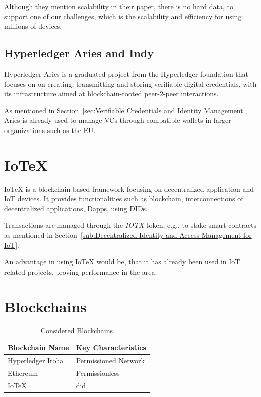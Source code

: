 Although they mention scalability in their paper, there is no hard data, to support one of our challenges, which is the
scalability and efficiency for using millions of devices.

\subsection{Hyperledger Aries and Indy} %
\label{sec:Hyperledger Aries}

Hyperledger Aries is a graduated project from the Hyperledger foundation that focuses on on creating, transmitting and
storing verifiable digital credentials, with its infrastructure aimed at blockchain-rooted peer-2-peer interactions.

As mentioned in Section~\ref{sec:Verifiable Credentials and Identity Management}, Aries is already used to manage VCs
through compatible wallets in larger organizations such as the EU.

\section{IoTeX} %
\label{sec:IoTeX}
IoTeX is a blockchain based framework focusing on decentralized application and IoT devices.
It provides functionalities such as blockchain, interconnections of decentralized applications, Dapps, using DIDs.

Transactions are managed through the \textit{IOTX} token, e.g., to stake smart contracts as mentioned in
Section~\ref{sub:Decentralized Identity and Access Management for IoT}.

An advantage in using IoTeX would be, that it has already been used in IoT related projects, proving performance in the
area.


\section{Blockchains} %
\label{sec:Blockchains}
\begin{table}
	\caption{Considered Blockchains}
	\label{tab:Considered Blockchains}
	\begin{center}
		\begin{tabular}[c]{|l|l|}
			\hline
			\textbf{Blockchain Name}                  & Key Characteristics  \\
			\hline
			Hyperledger Iroha \cite{hyperledger:wiki} & Permissioned Network \\
			\hline
			Ethereum                                  & Permissionless       \\
			\hline
			IoTeX \cite{iotex-bc-platform}            & did                  \\
			\hline
		\end{tabular}
	\end{center}
\end{table}

